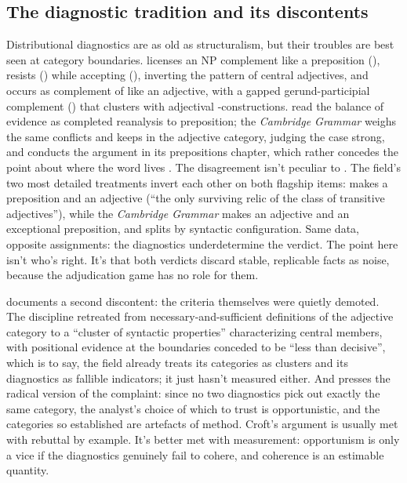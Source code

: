 \documentclass[12pt]{article}
\begin{document}
\subsection{The diagnostic tradition and its discontents}

Distributional diagnostics are as old as structuralism, but their
troubles are best seen at category boundaries.  licenses
an NP complement like a preposition (), resists
 () while accepting
 (), inverting the pattern of
central adjectives, and occurs as complement
of  like an adjective, with a gapped gerund-participial
complement () that
clusters with adjectival -constructions.
\textcite{maling1983} read the balance of evidence as completed
reanalysis to preposition; the \textit{Cambridge Grammar} weighs the
same conflicts and keeps  in the adjective category,
judging the case strong, and conducts the argument in its
prepositions chapter, which rather concedes the point about where the
word lives \parencite[ch.~7, \S2.2]{cgel2002}. The disagreement isn't
peculiar to . The field's two most detailed treatments
invert each other on both flagship items: \textcite{maling1983} makes
 a preposition and  an adjective
(\enquote{the only surviving relic of the class of transitive
adjectives}), while the \textit{Cambridge Grammar} makes 
an adjective and  an exceptional preposition, and
\textcite{aarts2007} splits  by syntactic configuration.
Same data, opposite assignments: the diagnostics underdetermine the
verdict. The point here isn't
who's right. It's that both verdicts discard stable, replicable facts
as noise, because the adjudication game has no role for them.

\textcite{matthews2014} documents a second discontent: the criteria
themselves were quietly demoted. The discipline retreated from
necessary-and-sufficient definitions of the adjective category to a
\enquote{cluster of syntactic properties} characterizing central
members, with positional evidence at the boundaries conceded to be
\enquote{less than decisive}, which is to say, the field already
treats its categories as clusters and its diagnostics as fallible
indicators; it just hasn't measured either. And \textcite{croft2001} presses the radical version of the
complaint: since no two diagnostics pick out exactly the same category,
the analyst's choice of which to trust is opportunistic, and the
categories so established are artefacts of method. Croft's argument is
usually met with rebuttal by example. It's better met with measurement:
opportunism is only a vice if the diagnostics genuinely fail to cohere,
and coherence is an estimable quantity.
\end{document}
